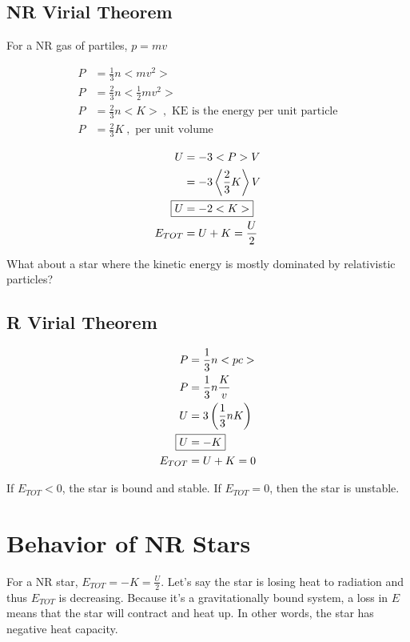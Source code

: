 \documentclass[10pt,letterpaper,final]{book}
\newcommand{\rp}{\right)}
\newcommand{\lp}{\left(}
\newcommand{\half}{\frac{1}{2}}
\begin{document}
\subsection{NR Virial Theorem}

For a NR gas of partiles, $p=mv$

\begin{align}
P &= \frac{1}{3}n<mv^2>\\
P &= \frac{2}{3}n<\half mv^2>\\
P &= \frac{2}{3}n<K>~,\text{ KE is the energy per unit particle}\\
P &= \frac{2}{3}K~,\text{ per unit volume}
\end{align}

\begin{align}
U &= -3<P>V\\
&= -3 \left< \frac{2}{3}K\right> V\\
\Aboxed{U &= -2<K>}\\
E_{TOT} &= U + K = \frac{U}{2}
\end{align}

What about a star where the kinetic energy is mostly dominated by relativistic particles?
\subsection{R Virial Theorem}

\begin{align}
P &= \frac{1}{3}n<pc>\\
P &= \frac{1}{3}n\frac{K}{v}\\
U &= 3 \lp \frac{1}{3}nK \rp\\
\Aboxed{U &= -K}\\
E_{TOT} &= U + K = 0
\end{align}

If $E_{TOT} < 0$, the star is bound and stable. If $E_{TOT} = 0$, then the star is unstable. 

\section{Behavior of NR Stars}

For a NR star, $E_{TOT} = -K = \frac{U}{2}$. Let's say the star is losing heat to radiation and thus $E_{TOT}$ is decreasing. Because it's a gravitationally bound system, a loss in $E$ means that the star will contract and heat up. In other words, the star has negative heat capacity. \\
\end{document}
